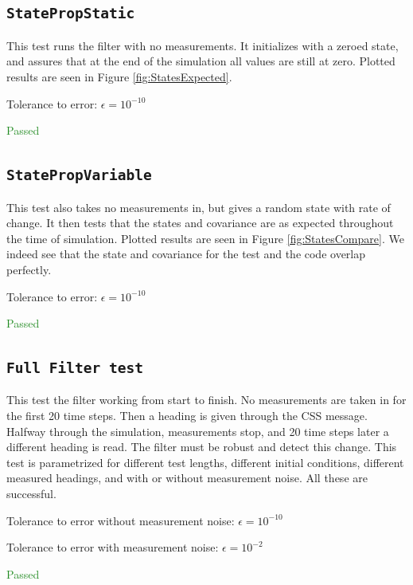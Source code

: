 \documentclass[]{BasiliskReportMemo}
\begin{document}
\subsection{\texttt{StatePropStatic}}

This test runs the filter with no measurements. It initializes with a zeroed state, and assures that at the end of the simulation all values are still at zero. Plotted results are seen in Figure \ref{fig:StatesExpected}.

Tolerance to error: $\epsilon = 10^{-10}$

\textcolor{ForestGreen}{Passed}



\subsection{\texttt{StatePropVariable}}

This test also takes no measurements in, but gives a random state with rate of change. It then tests that the states and covariance are as expected throughout the time of simulation. Plotted results are seen in Figure \ref{fig:StatesCompare}. We indeed see that the state and covariance for the test and the code overlap perfectly.

Tolerance to error: $\epsilon = 10^{-10}$

\textcolor{ForestGreen}{Passed}


\subsection{\texttt{Full Filter test}}

This test the filter working from start to finish. No measurements are taken in for the first 20 time steps. Then a heading is given through the CSS message. Halfway through the simulation, measurements stop, and 20 time steps later a different heading is read. The filter must be robust and detect this change. This test is parametrized for different test lengths, different initial conditions, different measured headings, and with or without measurement noise. All these are successful.

\vspace{0.2cm}
Tolerance to error without measurement noise: $\epsilon = 10^{-10}$

Tolerance to error with measurement noise: $\epsilon = 10^{-2}$

\textcolor{ForestGreen}{Passed}
\end{document}

